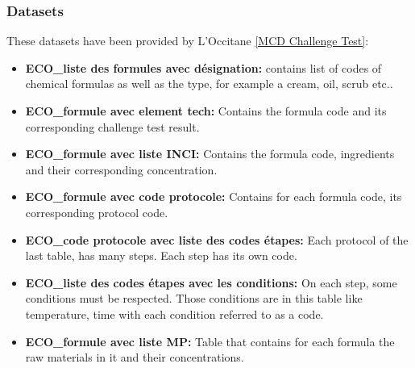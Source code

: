 \documentclass[a4paper,12pt,twoside]{report}
\begin{document}
\subsubsection{Datasets}
These datasets have been provided by L'Occitane \ref{MCD Challenge Test}:
\begin{itemize}
\item \textbf{ECO\_liste des formules avec désignation:} contains list of codes of chemical formulas as well as the type, for example a cream, oil, scrub etc..
\item \textbf{ECO\_formule avec element tech:} Contains the formula code and its corresponding challenge test result.
\item \textbf{ECO\_formule avec liste INCI:} Contains the formula code, ingredients and their corresponding concentration.
\item \textbf{ECO\_formule avec code protocole:} Contains for each formula code, its corresponding protocol code. 
\item \textbf{ECO\_code protocole avec liste des codes étapes:} Each protocol of the last table, has many steps. Each step has its own code.
\item \textbf{ECO\_liste des codes étapes avec les conditions:} On each step, some conditions must be respected. Those conditions are in this table like temperature, time with each condition referred to as a code.
\item \textbf{ECO\_formule avec liste MP:} Table that contains for each formula the raw materials in it and their concentrations.
\end{itemize}
\end{document}

